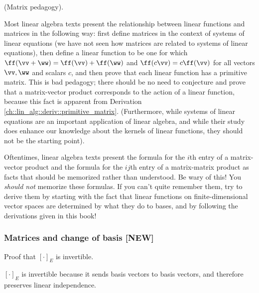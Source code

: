 \begin{remark}
    (Matrix pedagogy). 
    
    Most linear algebra texts present the relationship between linear functions and matrices in the following way: first define matrices in the context of systems of linear equations (we have not seen how matrices are related to systems of linear equations), then define a linear function to be one for which $\ff(\vv + \ww) = \ff(\vv) + \ff(\ww)$ and $\ff(c\vv) = c\ff(\vv)$ for all vectors $\vv, \ww$ and scalars $c$, and then prove that each linear function has a primitive matrix. This is bad pedagogy; there should be no need to conjecture and prove that a matrix-vector product corresponds to the action of a linear function, because this fact is apparent from Derivation \ref{ch::lin_alg::deriv::primitive_matrix}. (Furthermore, while systems of linear equations are an important application of linear algebra, and while their study does enhance our knowledge about the kernels of linear functions, they should not be the starting point).
    
    Oftentimes, linear algebra texts present the formula for the $i$th entry of a matrix-vector product and the formula for the $ij$th entry of a matrix-matrix product as facts that should be memorized rather than understood. Be wary of this! You \textit{should not} memorize these formulas. If you can't quite remember them, try to derive them by starting with the fact that linear functions on finite-dimensional vector spaces are determined by what they do to bases, and by following the derivations given in this book!
\end{remark}

\newpage

\subsubsection*{Matrices and change of basis [NEW]}

\begin{theorem}

    Proof that $[\cdot]_E$ is invertible.

    $[\cdot]_E$ is invertible because it sends basis vectors to basis vectors, and therefore preserves linear independence.
\end{theorem}

